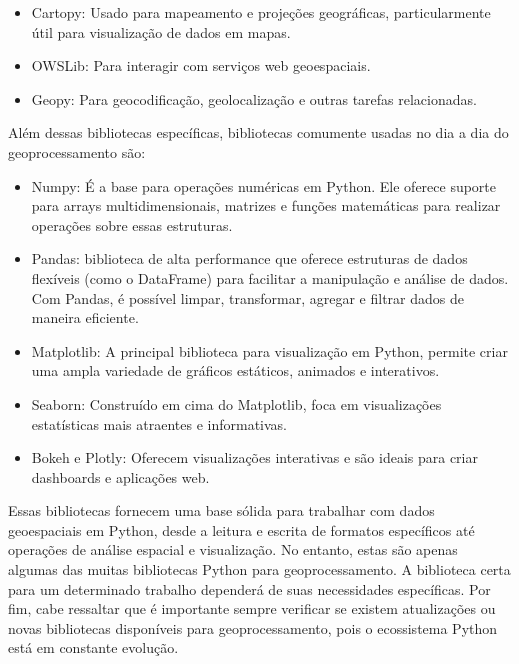 \documentclass[letterpaper,10pt,english]{jupyterBook}
\begin{document}
\sphinxAtStartPar
{}
\begin{itemize}
\item {} 
\sphinxAtStartPar
Cartopy: Usado para mapeamento e projeções geográficas, particularmente útil para visualização de dados em mapas.

\item {} 
\sphinxAtStartPar
OWSLib: Para interagir com serviços web geoespaciais.

\item {} 
\sphinxAtStartPar
Geopy: Para geocodificação, geolocalização e outras tarefas relacionadas.

\end{itemize}

\sphinxAtStartPar
Além dessas bibliotecas específicas, bibliotecas comumente usadas no dia a dia do geoprocessamento são:
\begin{itemize}
\item {} 
\sphinxAtStartPar
Numpy: É a base para operações numéricas em Python. Ele oferece suporte para arrays multidimensionais, matrizes e funções matemáticas para realizar operações sobre essas estruturas.

\item {} 
\sphinxAtStartPar
Pandas: biblioteca de alta performance que oferece estruturas de dados flexíveis (como o DataFrame) para facilitar a manipulação e análise de dados. Com Pandas, é possível limpar, transformar, agregar e filtrar dados de maneira eficiente.

\item {} 
\sphinxAtStartPar
Matplotlib: A principal biblioteca para visualização em Python, permite criar uma ampla variedade de gráficos estáticos, animados e interativos.

\item {} 
\sphinxAtStartPar
Seaborn: Construído em cima do Matplotlib, foca em visualizações estatísticas mais atraentes e informativas.

\item {} 
\sphinxAtStartPar
Bokeh e Plotly: Oferecem visualizações interativas e são ideais para criar dashboards e aplicações web.

\end{itemize}

\sphinxAtStartPar
Essas bibliotecas fornecem uma base sólida para trabalhar com dados geoespaciais em Python, desde a leitura e escrita de formatos específicos até operações de análise espacial e visualização. No entanto, estas são apenas algumas das muitas bibliotecas Python para geoprocessamento. A biblioteca certa para um determinado trabalho dependerá de suas necessidades específicas. Por fim, cabe ressaltar que é importante sempre verificar se existem atualizações ou novas bibliotecas disponíveis para geoprocessamento, pois o ecossistema Python está em constante evolução.
\end{document}
